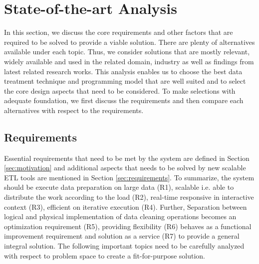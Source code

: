 
\chapter{State-of-the-art Analysis} %
\label{Chapter3} %


In this section, we discuss the core requirements and other factors that are required to be solved to provide a viable solution. There are plenty of alternatives available under each topic. Thus, we consider solutions that are mostly relevant, widely available and used in the related domain, industry as well as findings from latest related research works. This analysis enables us to choose the best data treatment technique and programming model that are well suited and to select the core design aspects that need to be considered. To make selections with adequate foundation, we first discuss the requirements and then compare each alternatives with respect to the requirements. 
\section{Requirements }
\label{sec:fundamentals}
Essential requirements that need to be met by the system are defined in Section \ref{sec:motivation} and additional aspects that needs to be solved by new scalable ETL tools are mentioned in Section \ref{sec:requirements}. To summarize, the system should be execute data preparation on large data (R1), scalable i.e. able to distribute the work according to the load  (R2), real-time responsive in interactive context (R3), efficient on iterative execution (R4). Further, Separation between logical and physical implementation of data cleaning operations becomes an optimization requirement (R5), providing flexibility (R6) behaves as a functional improvement requirement and solution as a service (R7) to provide a general integral solution.  The following important topics need to be carefully analyzed with respect to problem space to create a fit-for-purpose solution. 

